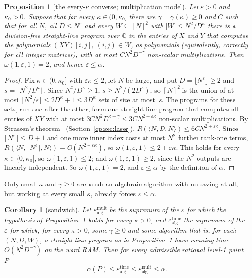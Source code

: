 \documentclass[11pt]{article}
\newtheorem{corollary}[theorem]{Corollary}
\newtheorem{proposition}[theorem]{Proposition}
\theoremstyle{definition}
\theoremstyle{remark}
\providecommand{\eps}{\varepsilon}
\providecommand{\Q}{\mathbb{Q}}
\newcommand{\abs}[1]{\lvert #1\rvert}
\newcommand{\mat}[3]{\langle #1,#2,#3\rangle} %
\begin{document}
\begin{proposition}[the every-$\kappa$ converse; multiplication model]\label{cp:A6}
Let $\eps>0$ and $\kappa_0>0$. Suppose that for every $\kappa\in(0,\kappa_0]$ there are $\gamma=\gamma(\kappa)\ge0$ and $C$ such that for all $N$, all $D\le N^\eps$ and every $W\subseteq[N]^2$ with $\abs W\le N^2/D^\kappa$ there is a division-free straight-line program over $\Q$ in the entries of $X$ and $Y$ that computes the polynomials $(XY)[i,j]$, $(i,j)\in W$, as polynomials (equivalently, correctly for all integer matrices), with at most $CN^2D^{-\gamma}$ non-scalar multiplications. Then $\omega(1,\eps,1)=2$, and hence $\eps\le\alpha$.
\end{proposition}

\begin{proof}
Fix $\kappa\in(0,\kappa_0]$ with $\eps\kappa\le2$, let $N$ be large, and put $D=\lfloor N^\eps\rfloor\ge2$ and $s=\lfloor N^2/D^\kappa\rfloor$. Since $N^2/D^\kappa\ge1$, $s\ge N^2/(2D^\kappa)$, so $[N]^2$ is the union of at most $\lceil N^2/s\rceil\le2D^\kappa+1\le3D^\kappa$ sets of size at most~$s$. The programs for these sets, run one after the other, form one straight-line program that computes all entries of $XY$ with at most $3CN^2D^{\kappa-\gamma}\le3CN^{2+\eps\kappa}$ non-scalar multiplications. By Strassen's theorem~\cite{Str73} (Section~\ref{cp:sec:laser}), $R(\mat ND N)\le6CN^{2+\eps\kappa}$. Since $\lceil N^\eps\rceil\le D+1$ and one more inner index costs at most $N^2$ further rank-one terms, $R(\mat N{\lceil N^\eps\rceil}N)=O(N^{2+\eps\kappa})$, so $\omega(1,\eps,1)\le2+\eps\kappa$. This holds for every $\kappa\in(0,\kappa_0]$, so $\omega(1,\eps,1)\le2$; and $\omega(1,\eps,1)\ge2$, since the $N^2$ outputs are linearly independent. So $\omega(1,\eps,1)=2$, and $\eps\le\alpha$ by the definition of $\alpha$.
\end{proof}

Only small $\kappa$ and $\gamma\ge0$ are used: an algebraic algorithm with no saving at all, but working at every small $\kappa$, already forces $\eps\le\alpha$.

\begin{corollary}[sandwich]\label{cp:A7}
Let $\eps^{\mathrm{mult}}_{\mathrm{alg}}$ be the supremum of the $\eps$ for which the hypothesis of Proposition~\ref{cp:A6} holds for every $\kappa>0$, and $\eps^{\mathrm{time}}_{\mathrm{alg}}$ the supremum of the $\eps$ for which, for every $\kappa>0$, some $\gamma\ge0$ and some algorithm that is, for each $(N,D,W)$, a straight-line program as in Proposition~\ref{cp:A6} have running time $O(N^2D^{-\gamma})$ on the word RAM. Then for every admissible rational level-1 point~$P$
\[
\alpha(P)\le\eps^{\mathrm{time}}_{\mathrm{alg}}\le\eps^{\mathrm{mult}}_{\mathrm{alg}}\le\alpha .
\]
\end{corollary}
\end{document}
